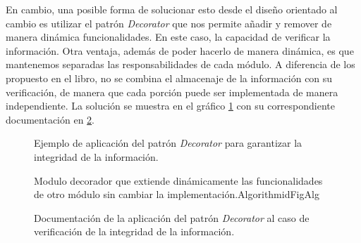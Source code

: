 En cambio, una posible forma de solucionar esto desde el diseño orientado al cambio es utilizar el patrón \textit{Decorator} que nos permite añadir y remover de manera dinámica funcionalidades. En este caso, la capacidad de verificar la información. Otra ventaja, además de poder hacerlo de manera dinámica, es que mantenemos separadas las responsabilidades de cada módulo. A diferencia de los propuesto en el libro, no se combina el almacenaje de la información con su verificación, de manera que cada porción puede ser implementada de manera independiente. La solución se muestra en el gráfico \ref{decorator} con su correspondiente documentación en \ref{docDecorator}.

\begin{figure}[h]
\caption{Ejemplo de aplicación del patrón \textit{Decorator} para garantizar la integridad de la información.}
\label{decorator}
\begin{center}
\end{center}
\end{figure}

\begin{figure}[H]
\caption{Documentación de la aplicación del patrón \textit{Decorator} al caso de verificación de la integridad de la información.}
\label{docDecorator}
\begin{pattern}[]{Modulo decorador que extiende dinámicamente las funcionalidades de otro módulo sin cambiar la implementación.}{Algorithm}{idFigAlg}
\assigns
{}

\end{pattern}
\end{figure}


